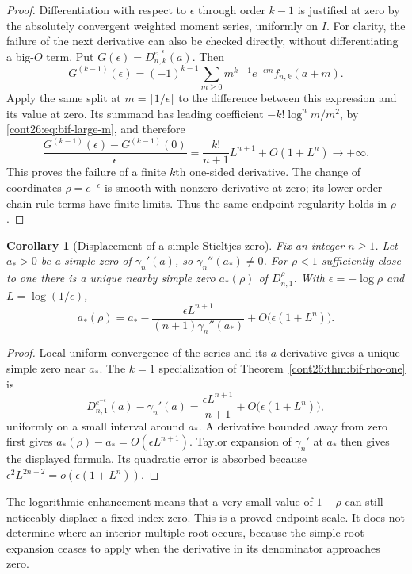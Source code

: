 \documentclass[11pt,letterpaper]{article}
\numberwithin{equation}{section}
\theoremstyle{plain}
\newtheorem{corollary}[theorem]{Corollary}
\theoremstyle{definition}
\theoremstyle{remark}
\begin{document}
\begin{proof}
Differentiation with respect to $\epsilon$ through order $k-1$ is
justified at zero by the absolutely convergent weighted moment series,
uniformly on $I$. For clarity, the failure of the next derivative can
also be checked directly, without differentiating a big-$O$ term.
Put $G(\epsilon)=D_{n,k}^{e^{-\epsilon}}(a)$. Then
\[
 G^{(k-1)}(\epsilon)
   =(-1)^{k-1}\sum_{m\geq0}m^{k-1}e^{-\epsilon m}f_{n,k}(a+m).
\]
Apply the same split at $m=\lfloor1/\epsilon\rfloor$ to the difference
between this expression and its value at zero. Its summand has leading
coefficient $-k!\log^n m/m^2$, by \eqref{cont26:eq:bif-large-m}, and therefore
\[
 \frac{G^{(k-1)}(\epsilon)-G^{(k-1)}(0)}{\epsilon}
   =\frac{k!}{n+1}L^{n+1}+O(1+L^n)\longrightarrow+\infty.
\]
This proves the failure of a finite $k$th one-sided derivative. The
change of coordinates $\rho=e^{-\epsilon}$ is smooth with nonzero
derivative at zero; its lower-order chain-rule terms have finite limits.
Thus the same endpoint regularity holds in $\rho$.
\end{proof}

\begin{corollary}[Displacement of a simple Stieltjes zero]
\label{cont26:cor:bif-stieltjes-displacement}
Fix an integer $n\geq1$. Let $a_*>0$ be a simple zero of $\gamma_n'(a)$, so
$\gamma_n''(a_*)\ne0$. For $\rho<1$ sufficiently close to one there is a
unique nearby simple zero $a_*(\rho)$ of $D_{n,1}^{\rho}$. With
$\epsilon=-\log\rho$ and $L=\log(1/\epsilon)$,
\begin{equation}\label{cont26:eq:bif-root-displacement}
 a_*(\rho)=a_*
   -\frac{\epsilon L^{n+1}}{(n+1)\gamma_n''(a_*)}
   +O\bigl(\epsilon(1+L^n)\bigr).
\end{equation}
\end{corollary}
\begin{proof}
Local uniform convergence of the series and its $a$-derivative gives
a unique simple zero near $a_*$. The $k=1$ specialization of
Theorem~\ref{cont26:thm:bif-rho-one} is
\[
 D_{n,1}^{e^{-\epsilon}}(a)-\gamma_n'(a)
     =\frac{\epsilon L^{n+1}}{n+1}
           +O\bigl(\epsilon(1+L^n)\bigr),
\]
uniformly on a small interval around $a_*$. A derivative bounded away
from zero first gives $a_*(\rho)-a_*=O(\epsilon L^{n+1})$.
Taylor expansion of $\gamma_n'$ at $a_*$ then gives the displayed
formula. Its quadratic error is absorbed because
$\epsilon^2L^{2n+2}=o(\epsilon(1+L^n))$.
\end{proof}

The logarithmic enhancement means that a very small value of $1-\rho$
can still noticeably displace a fixed-index zero. This is a proved
endpoint scale. It does not determine where an interior multiple root
occurs, because the simple-root expansion ceases to apply when the
derivative in its denominator approaches zero.
\end{document}
